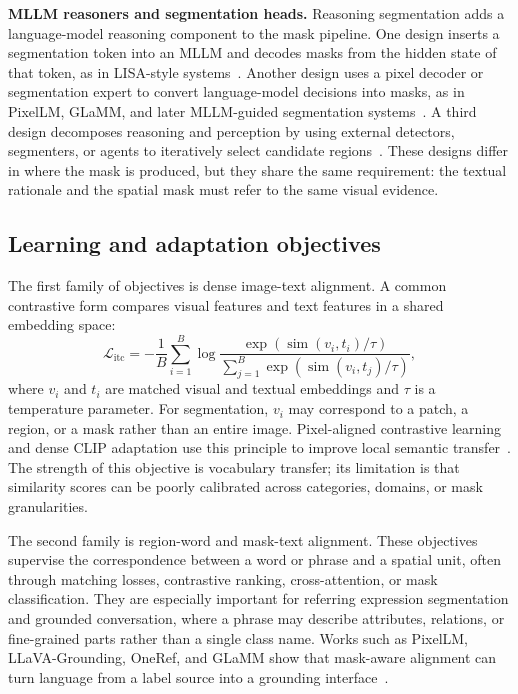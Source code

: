 \textbf{MLLM reasoners and segmentation heads.} Reasoning segmentation adds a language-model reasoning component to the mask pipeline. One design inserts a segmentation token into an MLLM and decodes masks from the hidden state of that token, as in LISA-style systems~\citep{xlaiLisaReasoningSegmentation2024}. Another design uses a pixel decoder or segmentation expert to convert language-model decisions into masks, as in PixelLM, GLaMM, and later MLLM-guided segmentation systems~\citep{renPixellmPixelReasoning2024,rasheedGlammPixelGrounding2024,zhangOmgllavaBridgingImagelevel2024}. A third design decomposes reasoning and perception by using external detectors, segmenters, or agents to iteratively select candidate regions~\citep{luoConnectingDotsTrainingFree2026,huangPixelsLogicPerceptionReasoning2026}. These designs differ in where the mask is produced, but they share the same requirement: the textual rationale and the spatial mask must refer to the same visual evidence.

\subsection{Learning and adaptation objectives}

The first family of objectives is dense image-text alignment. A common contrastive form compares visual features and text features in a shared embedding space:
\begin{equation}
    \mathcal{L}_{\mathrm{itc}} =
    -\frac{1}{B}\sum_{i=1}^{B}
    \log
    \frac{\exp(\operatorname{sim}(v_i,t_i)/\tau)}
    {\sum_{j=1}^{B}\exp(\operatorname{sim}(v_i,t_j)/\tau)} ,
\end{equation}
where $v_i$ and $t_i$ are matched visual and textual embeddings and $\tau$ is a temperature parameter. For segmentation, $v_i$ may correspond to a patch, a region, or a mask rather than an entire image. Pixel-aligned contrastive learning and dense CLIP adaptation use this principle to improve local semantic transfer~\citep{sikdarPicazoPixelalignedContrastive2025,yangExploringCLIPsDense2025}. The strength of this objective is vocabulary transfer; its limitation is that similarity scores can be poorly calibrated across categories, domains, or mask granularities.

The second family is region-word and mask-text alignment. These objectives supervise the correspondence between a word or phrase and a spatial unit, often through matching losses, contrastive ranking, cross-attention, or mask classification. They are especially important for referring expression segmentation and grounded conversation, where a phrase may describe attributes, relations, or fine-grained parts rather than a single class name. Works such as PixelLM, LLaVA-Grounding, OneRef, and GLaMM show that mask-aware alignment can turn language from a label source into a grounding interface~\citep{xuPixelalignedLanguageModel2024,zhangLlavagroundingGroundedVisual2024,xiaoOnerefUnifiedOnetower2024,rasheedGlammPixelGrounding2024}.

